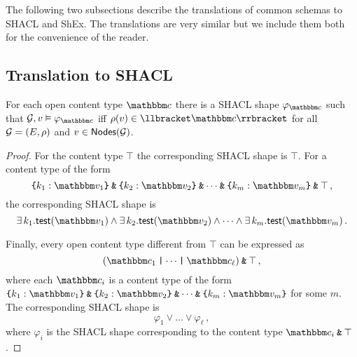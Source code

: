 
The following two subsections describe the translations of common schemas to SHACL and ShEx. The translations are very similar but we include them both for the convenience of the reader.

\subsection{Translation to SHACL}


\begin{lemma}
\label{lem:contents-shacl}
For each open content type $\ntype$ there is a SHACL shape $\varphi_{\ntype}$ such that  $\graph, v\models \varphi_{\ntype}$ iff $\rho(v) \in \sem{\ntype}$ for all  $\mathcal{G}=(E,\rho)$ and $v\in\mathsf{Nodes}(\mathcal{G})$.
\end{lemma}

\begin{proof}
For the content type $\top$ the corresponding SHACL shape is $\top$.
For a content type of the form \[\closedRT{k_1:\vtype_1}\tAnd\closedRT{k_2:\vtype_2}\tAnd \dots \tAnd \closedRT{k_m :\vtype_m}\tAnd \top\,,\] the corresponding SHACL shape is \[\exists\, k_1. \test(\vtype_1) \land \exists\, k_2. \test(\vtype_2) \land \dots \land \exists\, k_m. \test(\vtype_m)\,.\]


Finally, every open content type different from $\top$ can be expressed as 
\[(\ntype_1 \tOr \dots \tOr \ntype_\ell)\tAnd \top\,,\]
where each $\ntype_i$ is a  content type of the form $\closedRT{k_1:\vtype_1}\tAnd\closedRT{k_2:\vtype_2}\tAnd \dots \tAnd \closedRT{k_m :\vtype_m}$ for some $m$.
The corresponding SHACL shape is 
\[\varphi_1 \lor \dots \lor \varphi_\ell\,,\]
where $\varphi_i$ is the SHACL shape corresponding to the content type $\ntype_i \tAnd \top$.
\end{proof}


